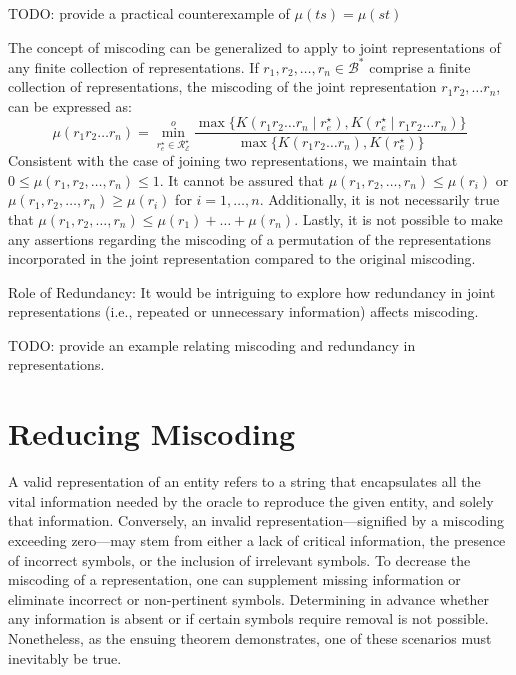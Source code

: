 \begin{example}
{\color{red} TODO: provide a practical counterexample of $\mu(ts) = \mu(st)$}
\end{example}

The concept of miscoding can be generalized to apply to joint representations of any finite collection of representations. If $r_1, r_2, \ldots, r_n \in \mathcal{B}^\ast$ comprise a finite collection of representations, the miscoding of the joint representation $r_1 r_2, \ldots r_n$, can be expressed as:
\[
\mu(r_1 r_2 \ldots r_n) = \overset{o}{ \underset{ r^\star_e \in \mathcal{R}^\star_\mathcal{E} } \min} \frac{ \max\{ K \left( r_1 r_2 \ldots r_n \mid r^\star_e \right), K \left( r^\star_e \mid r_1 r_2 \ldots r_n \right) \} } { \max\{ K \left( r_1 r_2 \ldots r_n \right), K \left( r^\star_e \right) \} }
\]
Consistent with the case of joining two representations, we maintain that $0 \leq \mu(r_1, r_2, \ldots, r_n) \leq 1$. It cannot be assured that $\mu(r_1, r_2, \ldots, r_n) \leq \mu(r_i)$ or $\mu(r_1, r_2, \ldots, r_n) \geq \mu(r_i)$ for $i = 1, \ldots, n$. Additionally, it is not necessarily true that $\mu(r_1, r_2, \ldots, r_n) \leq \mu(r_1) + \ldots + \mu(r_n)$. Lastly, it is not possible to make any assertions regarding the miscoding of a permutation of the representations incorporated in the joint representation compared to the original miscoding.

{\color{red} Role of Redundancy: It would be intriguing to explore how redundancy in joint representations (i.e., repeated or unnecessary information) affects miscoding.}

\begin{example}
{\color{red} TODO: provide an example relating miscoding and redundancy in representations.}
\end{example}

%
%

\section{Reducing Miscoding}

A valid representation of an entity refers to a string that encapsulates all the vital information needed by the oracle to reproduce the given entity, and solely that information. Conversely, an invalid representation—signified by a miscoding exceeding zero—may stem from either a lack of critical information, the presence of incorrect symbols, or the inclusion of irrelevant symbols. To decrease the miscoding of a representation, one can supplement missing information or eliminate incorrect or non-pertinent symbols. Determining in advance whether any information is absent or if certain symbols require removal is not possible. Nonetheless, as the ensuing theorem demonstrates, one of these scenarios must inevitably be true.

